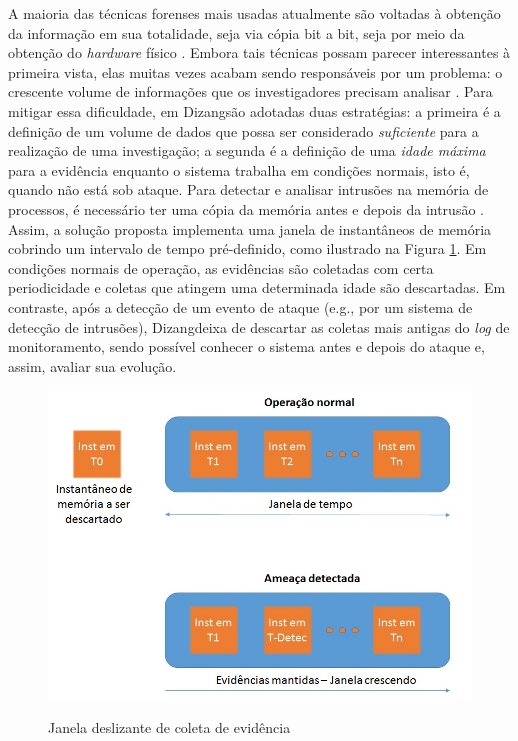 \documentclass[conference]{IEEEtran}
\newcommand{\marcosR}[1]{{\color{brown}{COMMENT: #1}}}
\newcommand{\fancyname}{Dizang}
\begin{document}
A maioria das técnicas forenses mais usadas atualmente são voltadas à obtenção da informação em sua totalidade, seja via cópia bit a bit, seja por meio da obtenção do \textit{hardware} físico \cite{Simou_Cloud_Chlng:2014} \cite{Bem_Past_Present_Future:2008}. 
%
Embora tais técnicas possam parecer interessantes à primeira vista, elas muitas vezes acabam sendo responsáveis por um problema: o crescente volume de informações que os investigadores precisam analisar \cite{Quick_Increase_Volume_Impact:2014}.
%
Para mitigar essa dificuldade, em \fancyname são adotadas duas estratégias: a primeira é a definição de um volume de dados que possa ser considerado \textit{suficiente} para a realização de uma investigação; a segunda é a definição de uma \textit{idade máxima} para a evidência enquanto o sistema trabalha em condições normais, isto é, quando não está sob ataque.
%
Para detectar e analisar intrusões na memória de processos, é necessário ter uma cópia da memória antes e depois da intrusão \cite{Case_Memory_Forensics:2014}. 
%
Assim, a solução proposta implementa uma janela de instantâneos de memória cobrindo um intervalo de tempo pré-definido, como ilustrado na Figura \ref{fig:janela}. 
%
Em condições normais de operação, as evidências são coletadas com certa periodicidade e coletas que atingem uma determinada idade são descartadas.
%
Em contraste, após a detecção de um evento de ataque (e.g., por um sistema de detecção de intrusões), \fancyname deixa de descartar as coletas mais antigas do \textit{log} de monitoramento, sendo possível conhecer o sistema antes e depois do ataque e, assim, avaliar sua evolução.
%
%

\begin{figure}[htb!]
\caption{Janela deslizante de coleta de evidência}
\includegraphics[scale=0.4]{janela.jpg}
\centering
\label{fig:janela}
\end{figure}
\end{document}

